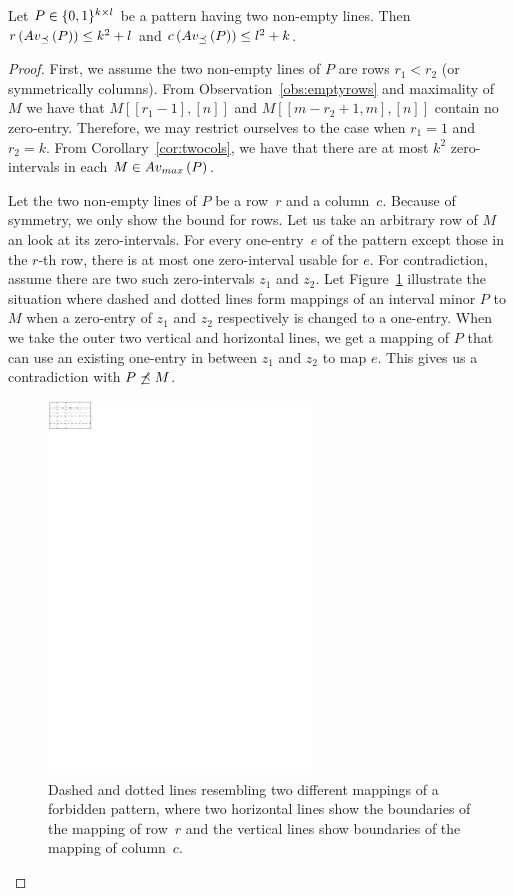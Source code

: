\begin{lemma}
Let $P\in\{0,1\}^{k\times l}$ be a pattern having two non-empty lines. Then $r\left(Av_{\preceq}\left(P\right)\right)\leq k^2+l$ and $c\left(Av_{\preceq}\left(P\right)\right)\leq l^2+k$.
\end{lemma}
\begin{proof}
First, we assume the two non-empty lines of $P$ are rows $r_1<r_2$ (or symmetrically columns). From Observation~\ref{obs:emptyrows} and maximality of $M$ we have that $M[[r_1-1],[n]]$ and $M[[m-r_2+1,m],[n]]$ contain no zero-entry. Therefore, we may restrict ourselves to the case when $r_1=1$ and $r_2=k$. From Corollary~\ref{cor:twocols}, we have that there are at most $k^2$ zero-intervals in each $M\in Av_{max}\left(P\right)$.

Let the two non-empty lines of $P$ be a row~$r$ and a column~$c$. Because of symmetry, we only show the bound for rows. Let us take an arbitrary row of $M$ an look at its zero-intervals. For every one-entry~$e$ of the pattern except those in the $r$-th row, there is at most one zero-interval usable for $e$. For contradiction, assume there are two such zero-intervals $z_1$ and $z_2$. Let Figure~\ref{fig:twolines} illustrate the situation where dashed and dotted lines form mappings of an interval minor $P$ to $M$ when a zero-entry of $z_1$ and $z_2$ respectively is changed to a one-entry. When we take the outer two vertical and horizontal lines, we get a mapping of $P$ that can use an existing one-entry in between $z_1$ and $z_2$ to map $e$. This gives us a contradiction with $P\not\preceq M$.

\begin{figure}[!ht]
\centering
\includegraphics[width=70mm]{img/twolines.pdf}
\caption{Dashed and dotted lines resembling two different mappings of a forbidden pattern, where two horizontal lines show the boundaries of the mapping of row~$r$ and the vertical lines show boundaries of the mapping of column~$c$.}
\label{fig:twolines}
\end{figure}


\end{proof}

